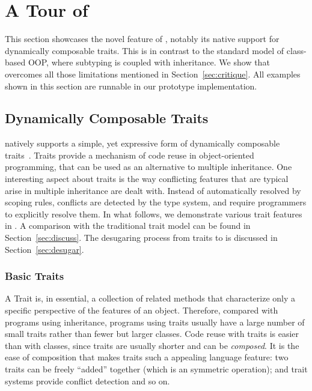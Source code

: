 \section{A Tour of \name}

This section showcases the novel feature of \name, notably its native support
for dynamically composable traits. This is in contrast to the standard model of
class-based OOP, where subtyping is coupled with inheritance. We show that \name
overcomes all those limitations mentioned in Section~\ref{sec:critique}. All
examples shown in this section are runnable in our prototype implementation.


\subsection{Dynamically Composable Traits}
\label{sec:traits}

\name natively supports a simple, yet expressive form of dynamically composable
traits~\cite{scharli2003traits}. Traits provide a mechanism of code reuse in
object-oriented programming, that can be used as an alternative to multiple
inheritance. One interesting aspect about traits is the way conflicting features
that are typical arise in multiple inheritance are dealt with. Instead of
automatically resolved by scoping rules, conflicts are detected by the type
system, and require programmers to explicitly resolve them. In what follows, we
demonstrate various trait features in \name. A comparison with the traditional
trait model can be found in Section~\ref{sec:discuss}. The desugaring process
from traits to \bname is discussed in Section~\ref{sec:desugar}.

\subsubsection{Basic Traits}

A Trait is, in essential, a collection of related methods that characterize only
a specific perspective of the features of an object. Therefore, compared with
programs using inheritance, programs using traits usually have a large number of
small traits rather than fewer but larger classes. Code reuse with traits is
easier than with classes, since traits are usually shorter and can be
\textit{composed}. It is the ease of composition that makes traits such a
appealing language feature: two traits can be freely ``added'' together (which
is an symmetric operation); and trait systems provide conflict detection and so
on.

